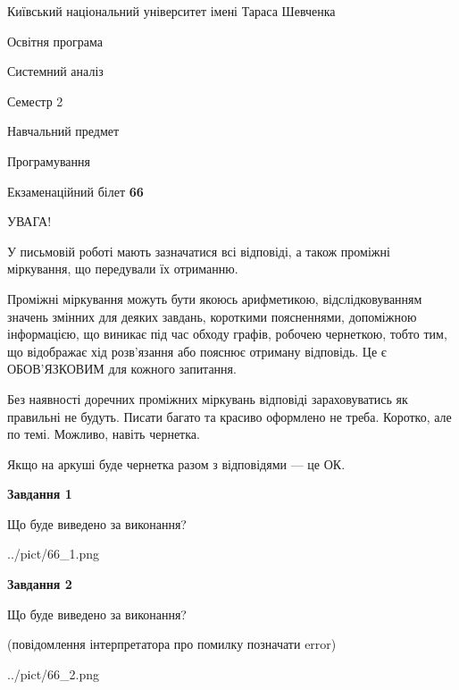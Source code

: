 \documentclass[12pt, ukrainian]{article}
\begin{document}
{{\begin {small}\par
{ \center  Київський національний університет імені Тараса Шевченка \par}
{\parbox {5 cm}{Освітня програма \hfill}{\parbox {7 cm}{Системний аналіз \hfill}}\parbox {6 cm}{\hfill Семестр 2}}\par
{\parbox {5 cm} {Навчальний предмет \hfill}\parbox {7 cm}{Програмування \hfill}\parbox {6cm}{\hfill}\par}\vspace{-7pt} \end{small}}{\center Екзаменаційний білет \No \textbf
{ 66 }\par}}
{
\begin {large}
УВАГА!

У письмовій роботі мають зазначатися всі відповіді, а також проміжні міркування, що передували їх отриманню.

Проміжні міркування можуть бути якоюсь арифметикою, відслідковуванням зна\-чень змінних для деяких завдань,
короткими поясненнями, допоміжною інформацією, що виникає під час обходу графів, робочею чернеткою,
тобто тим, що відображає хід розв’язання або пояснює отриману відповідь.
Це є ОБОВ’ЯЗКОВИМ для кожного запитання.

Без наявності доречних проміжних міркувань відповіді зараховуватись як правиль\-ні не будуть.
Писати багато та красиво оформлено не треба. Коротко, але по темі. Можли\-во, навіть чернетка.

Якщо на аркуші буде чернетка разом з відповідями --- це ОК.

\newpage

{\begin {center}\textbf{Завдання 1}\end {center}}\par
Що буде виведено за виконання?\par
\begin{center}
	{../pict/66_1.png}
\end{center}
\newpage

{\begin {center}\textbf{Завдання 2}\end {center}}\par
Що буде виведено за виконання?\par
 (повідомлення інтерпретатора про помилку позначати error)\par
\begin{center}
	{../pict/66_2.png}
\end{center}
\newpage


\end{large}}
\end{document}
